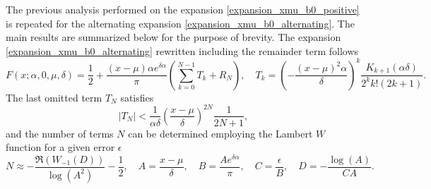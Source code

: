 \documentclass[10pt,a4paper,oneside]{article}
\numberwithin{equation}{section}
\begin{document}
The previous analysis performed on the expansion \eqref{expansion_xmu_b0_positive} is repeated for the alternating expansion \eqref{expansion_xmu_b0_alternating}. The main results are summarized below for the purpose of brevity. The expansion \eqref{expansion_xmu_b0_alternating} rewritten including the remainder term follows
\begin{equation}
F(x; \alpha, 0, \mu, \delta) = \frac{1}{2} + \frac{(x-\mu)\alpha e^{\delta \alpha}}{\pi} \left( \sum_{k=0}^{N-1} T_k + R_N\right),  \quad T_k = \left(-\frac{(x-\mu)^2 \alpha}{\delta}\right)^k \frac{K_{k+1}(\alpha \delta)}{2^k k! (2k + 1)}.
\end{equation}
The last omitted term $T_N$ satisfies
\begin{equation}
|T_N| < \frac{1}{\alpha \delta} \left(\frac{x-\mu}{\delta}\right)^{2N} \frac{1}{2N + 1},
\end{equation} 
and the number of terms $N$ can be determined employing the Lambert $W$ function for a given error $\epsilon$
\begin{equation}
N \approx -\frac{\Re(W_{-1}(D))}{\log(A^2)} - \frac{1}{2}, \quad A = \frac{x-\mu}{\delta}, \quad B = \frac{A e^{\delta \alpha}}{\pi}, \quad C = \frac{\epsilon}{B}, \quad D = -\frac{\log(A)}{CA}.
\end{equation}
\end{document}
